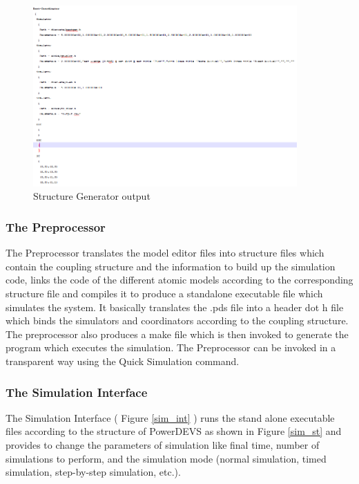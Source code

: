 \documentclass[titlepage]{article}%
\begin{document}
{\begin{figure}[ht!]
  \centering
    \includegraphics[width=0.9\textwidth]{Fig7.png}
    \caption{Structure Generator output}
    \label{Struc_gen}
\end{figure}



\subsubsection{The Preprocessor}
The Preprocessor translates the model editor files into structure files which contain the coupling structure and the information to build up the simulation code, links the code of the different atomic models according to the corresponding structure file and compiles it to produce a standalone executable file which simulates the system. It basically translates the .pds file into a header dot h file which binds the simulators and coordinators according to the coupling structure. The preprocessor also produces a make file which is then invoked to generate the program which executes the simulation. The Preprocessor can be invoked in a transparent way using the Quick Simulation command.
\subsubsection{The Simulation Interface }
The Simulation Interface ( Figure \ref{sim_int} ) runs the stand alone executable files according to the structure of PowerDEVS as shown in Figure \ref{sim_st} and provides to change the parameters of simulation like final time, number of simulations to perform, and the simulation mode (normal simulation, timed simulation, step-by-step simulation, etc.).


}
\end{document}
